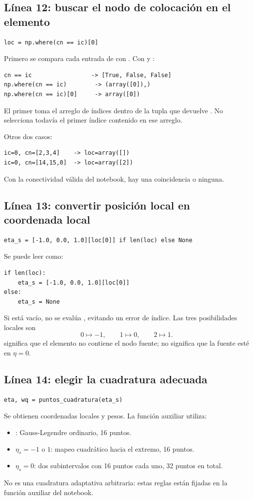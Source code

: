 \documentclass[11pt,a4paper]{article}
\numberwithin{equation}{section}
\DeclareRobustCommand{\code}[1]{\texttt{\detokenize{#1}}}
\begin{document}
\subsection{L\'inea 12: buscar el nodo de colocaci\'on en el elemento}
\begin{lstlisting}
loc = np.where(cn == ic)[0]
\end{lstlisting}
Primero se compara cada entrada de \code{cn} con \code{ic}.
Con \code{ic=0} y \code{cn=[0,1,2]}:
\begin{lstlisting}[language={}]
cn == ic                 -> [True, False, False]
np.where(cn == ic)        -> (array([0]),)
np.where(cn == ic)[0]     -> array([0])
\end{lstlisting}
El primer \code{[0]} toma el arreglo de \'indices dentro de la
tupla que devuelve \code{np.where}. No selecciona todav\'ia
el primer \'indice contenido en ese arreglo.

Otros dos casos:
\begin{lstlisting}[language={}]
ic=0, cn=[2,3,4]    -> loc=array([])
ic=0, cn=[14,15,0]  -> loc=array([2])
\end{lstlisting}
Con la conectividad v\'alida del notebook, hay una coincidencia o ninguna.

\subsection{L\'inea 13: convertir posici\'on local en coordenada local}
\begin{lstlisting}
eta_s = [-1.0, 0.0, 1.0][loc[0]] if len(loc) else None
\end{lstlisting}
Se puede leer como:
\begin{lstlisting}
if len(loc):
    eta_s = [-1.0, 0.0, 1.0][loc[0]]
else:
    eta_s = None
\end{lstlisting}
Si \code{loc} est\'a vac\'io, no se eval\'ua \code{loc[0]},
evitando un error de \'indice. Las tres posibilidades locales son
\begin{equation}
 0\longmapsto-1,\qquad1\longmapsto0,\qquad2\longmapsto1.
\end{equation}
\code{None} significa que el elemento no contiene el nodo fuente;
no significa que la fuente est\'e en $\eta=0$.

\subsection{L\'inea 14: elegir la cuadratura adecuada}
\begin{lstlisting}
eta, wq = puntos_cuadratura(eta_s)
\end{lstlisting}
Se obtienen coordenadas locales y pesos.
La funci\'on auxiliar utiliza:
\begin{itemize}
 \item \code{None}: Gauss-Legendre ordinario, 16 puntos.
 \item $\eta_s=-1$ o $1$: mapeo cuadr\'atico hacia el extremo,
 16 puntos.
 \item $\eta_s=0$: dos subintervalos con 16 puntos cada uno,
 32 puntos en total.
\end{itemize}
No es una cuadratura adaptativa arbitraria: estas reglas est\'an
fijadas en la funci\'on auxiliar del notebook.
\end{document}
